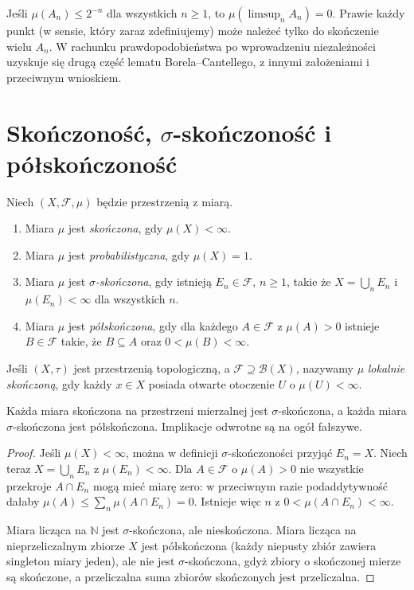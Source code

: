 \begin{przyklad}[Interpretacja]
Jeśli $\mu(A_n)\leq2^{-n}$ dla wszystkich $n\geq1$, to
$\mu(\limsup_nA_n)=0$. Prawie każdy punkt (w sensie, który
zaraz zdefiniujemy) może należeć tylko do skończenie wielu $A_n$.
W rachunku prawdopodobieństwa po wprowadzeniu niezależności
uzyskuje się drugą część lematu Borela--Cantellego, z innymi
założeniami i przeciwnym wnioskiem.
\end{przyklad}

\section{Skończoność, \texorpdfstring{$\sigma$}{sigma}-skończoność i półskończoność}

\begin{definicja}
\label{def:measure-finiteness}
Niech $(X,\mathcal F,\mu)$ będzie przestrzenią z miarą.
\begin{enumerate}
\item Miara $\mu$ jest \emph{skończona}, gdy $\mu(X)<\infty$.
\item Miara $\mu$ jest \emph{probabilistyczna}, gdy $\mu(X)=1$.
\item Miara $\mu$ jest \emph{$\sigma$-skończona}, gdy istnieją
$E_n\in\mathcal F$, $n\geq1$, takie że
$X=\bigcup_nE_n$ i $\mu(E_n)<\infty$ dla wszystkich $n$.
\item Miara $\mu$ jest \emph{półskończona}, gdy dla każdego
$A\in\mathcal F$ z $\mu(A)>0$ istnieje $B\in\mathcal F$
takie, że $B\subseteq A$ oraz $0<\mu(B)<\infty$.
\end{enumerate}
Jeśli $(X,\tau)$ jest przestrzenią topologiczną, a
$\mathcal F\supseteq\mathcal B(X)$, nazywamy $\mu$
\emph{lokalnie skończoną}, gdy każdy $x\in X$ posiada
otwarte otoczenie $U$ o $\mu(U)<\infty$.
\end{definicja}

\begin{twierdzenie}[Implikacje]
\label{thm:finiteness-implications}
Każda miara skończona na przestrzeni mierzalnej jest
$\sigma$-skończona, a każda miara $\sigma$-skończona
jest półskończona. Implikacje odwrotne są na ogół fałszywe.
\end{twierdzenie}
\begin{proof}
Jeśli $\mu(X)<\infty$, można w definicji $\sigma$-skończoności
przyjąć $E_n=X$. Niech teraz $X=\bigcup_nE_n$ z
$\mu(E_n)<\infty$. Dla $A\in\mathcal F$ o $\mu(A)>0$
nie wszystkie przekroje $A\cap E_n$ mogą mieć miarę zero:
w przeciwnym razie podaddytywność dałaby
$\mu(A)\leq\sum_n\mu(A\cap E_n)=0$.
Istnieje więc $n$ z $0<\mu(A\cap E_n)<\infty$.

Miara licząca na $\mathbb N$ jest $\sigma$-skończona,
ale nieskończona. Miara licząca na nieprzeliczalnym
zbiorze $X$ jest półskończona (każdy niepusty zbiór
zawiera singleton miary jeden), ale nie jest
$\sigma$-skończona, gdyż zbiory o skończonej mierze
są skończone, a przeliczalna suma zbiorów skończonych
jest przeliczalna.
\end{proof}

